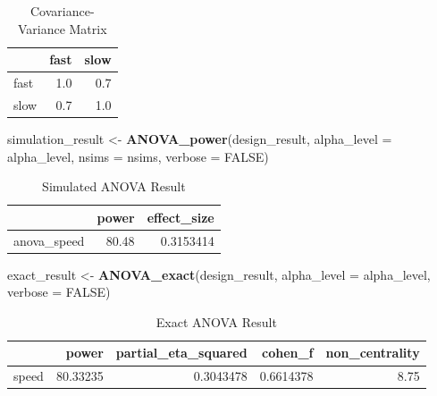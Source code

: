 \documentclass[
]{book}
\newenvironment{Shaded}{\begin{snugshade}}{\end{snugshade}}
\newcommand{\DataTypeTok}[1]{\textcolor[rgb]{0.13,0.29,0.53}{#1}}
\newcommand{\KeywordTok}[1]{\textcolor[rgb]{0.13,0.29,0.53}{\textbf{#1}}}
\newcommand{\NormalTok}[1]{#1}
\newcommand{\OtherTok}[1]{\textcolor[rgb]{0.56,0.35,0.01}{#1}}
\newcommand{\StringTok}[1]{\textcolor[rgb]{0.31,0.60,0.02}{#1}}
\begin{document}
\begin{table}[!h]

\caption{\label{tab:unnamed-chunk-72}Covariance-Variance Matrix}
\centering
\begin{tabular}[t]{l|r|r}
\hline
  & fast & slow\\
\hline
fast & 1.0 & 0.7\\
\hline
slow & 0.7 & 1.0\\
\hline
\end{tabular}
\end{table}
\newpage

\begin{Shaded}
\begin{Highlighting}[]
\NormalTok{simulation_result <-}\StringTok{ }\KeywordTok{ANOVA_power}\NormalTok{(design_result, }
                                 \DataTypeTok{alpha_level =}\NormalTok{ alpha_level, }
                                 \DataTypeTok{nsims =}\NormalTok{ nsims,}
                                 \DataTypeTok{verbose =} \OtherTok{FALSE}\NormalTok{)}
\end{Highlighting}
\end{Shaded}

\begin{table}[!h]

\caption{\label{tab:unnamed-chunk-74}Simulated ANOVA Result}
\centering
\begin{tabular}[t]{l|r|r}
\hline
  & power & effect\_size\\
\hline
anova\_speed & 80.48 & 0.3153414\\
\hline
\end{tabular}
\end{table}

\begin{Shaded}
\begin{Highlighting}[]
\NormalTok{exact_result <-}\StringTok{ }\KeywordTok{ANOVA_exact}\NormalTok{(design_result,}
                            \DataTypeTok{alpha_level =}\NormalTok{ alpha_level,}
                            \DataTypeTok{verbose =} \OtherTok{FALSE}\NormalTok{)}
\end{Highlighting}
\end{Shaded}

\begin{table}[!h]

\caption{\label{tab:unnamed-chunk-76}Exact ANOVA Result}
\centering
\begin{tabular}[t]{l|r|r|r|r}
\hline
  & power & partial\_eta\_squared & cohen\_f & non\_centrality\\
\hline
speed & 80.33235 & 0.3043478 & 0.6614378 & 8.75\\
\hline
\end{tabular}
\end{table}
\end{document}
